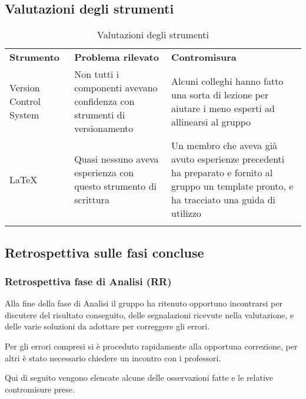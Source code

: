 \documentclass[../piano_di_qualifica.tex]{subfiles}
\begin{document}
\subsection{Valutazioni degli strumenti}
\label{sub:valut_strumenti}

\begin{center}
	\begin{longtable}{|p{3cm}|p{4.5cm}|p{4.5cm}|}
		\hline
		\rowcolor{lightgray}
		\textbf{Strumento} & \textbf{Problema rilevato} & \textbf{Contromisura} \\
		Version Control System & Non tutti i componenti avevano confidenza con strumenti di versionamento & Alcuni colleghi hanno fatto una sorta di lezione per aiutare i meno esperti ad allinearsi al gruppo \\
		\LaTeX & Quasi nessuno aveva esperienza con questo strumento di scrittura & Un membro che aveva già avuto esperienze precedenti ha preparato e fornito al gruppo un template pronto, e ha tracciato una guida di utilizzo \\
		\hline
		\rowcolor{white}
		\caption{Valutazioni degli strumenti}
	\end{longtable}
\end{center}

\subsection{Retrospettiva sulle fasi concluse}
\label{sub:retrospettiva}

\subsubsection{Retrospettiva fase di Analisi (RR)}
\label{par:retrospettiva-RR}
Alla fine della fase di Analisi il gruppo ha ritenuto opportuno incontrarsi per discutere del risultato conseguito, delle segnalazioni ricevute nella valutazione, e delle varie soluzioni da adottare per correggere gli errori.

Per gli errori compresi si è proceduto rapidamente alla opportuna correzione, per altri è stato necessario chiedere un incontro
con i professori.

Qui di seguito vengono elencate alcune delle osservazioni fatte e le relative contromisure prese.
\end{document}
